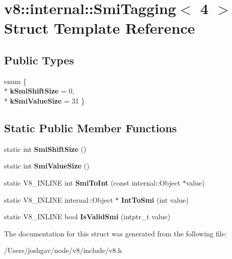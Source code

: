 \hypertarget{structv8_1_1internal_1_1_smi_tagging_3_014_01_4}{}\section{v8\+:\+:internal\+:\+:Smi\+Tagging$<$ 4 $>$ Struct Template Reference}
\label{structv8_1_1internal_1_1_smi_tagging_3_014_01_4}
\subsection*{Public Types}
\begin{DoxyCompactItemize}
\item 
enum \{ \\*
{\bfseries k\+Smi\+Shift\+Size} = 0, 
\\*
{\bfseries k\+Smi\+Value\+Size} = 31
 \}\hypertarget{structv8_1_1internal_1_1_smi_tagging_3_014_01_4_a4a08a18726d053536f2e1988bb1e1cfa}{}\label{structv8_1_1internal_1_1_smi_tagging_3_014_01_4_a4a08a18726d053536f2e1988bb1e1cfa}

\end{DoxyCompactItemize}
\subsection*{Static Public Member Functions}
\begin{DoxyCompactItemize}
\item 
static int {\bfseries Smi\+Shift\+Size} ()\hypertarget{structv8_1_1internal_1_1_smi_tagging_3_014_01_4_a6b4e44bb5de76851c70fb604e1a7a019}{}\label{structv8_1_1internal_1_1_smi_tagging_3_014_01_4_a6b4e44bb5de76851c70fb604e1a7a019}

\item 
static int {\bfseries Smi\+Value\+Size} ()\hypertarget{structv8_1_1internal_1_1_smi_tagging_3_014_01_4_a07e9a8ef19de5cb4bba23cd9756d7b3e}{}\label{structv8_1_1internal_1_1_smi_tagging_3_014_01_4_a07e9a8ef19de5cb4bba23cd9756d7b3e}

\item 
static V8\+\_\+\+I\+N\+L\+I\+NE int {\bfseries Smi\+To\+Int} (const internal\+::\+Object $\ast$value)\hypertarget{structv8_1_1internal_1_1_smi_tagging_3_014_01_4_a62bf3521541e99483c8d0743685dc375}{}\label{structv8_1_1internal_1_1_smi_tagging_3_014_01_4_a62bf3521541e99483c8d0743685dc375}

\item 
static V8\+\_\+\+I\+N\+L\+I\+NE internal\+::\+Object $\ast$ {\bfseries Int\+To\+Smi} (int value)\hypertarget{structv8_1_1internal_1_1_smi_tagging_3_014_01_4_abbc2788d901a590f3b9276e7e0d4059b}{}\label{structv8_1_1internal_1_1_smi_tagging_3_014_01_4_abbc2788d901a590f3b9276e7e0d4059b}

\item 
static V8\+\_\+\+I\+N\+L\+I\+NE bool {\bfseries Is\+Valid\+Smi} (intptr\+\_\+t value)\hypertarget{structv8_1_1internal_1_1_smi_tagging_3_014_01_4_a7ca3b3a7b14e2fbea5decac3675ac619}{}\label{structv8_1_1internal_1_1_smi_tagging_3_014_01_4_a7ca3b3a7b14e2fbea5decac3675ac619}

\end{DoxyCompactItemize}


The documentation for this struct was generated from the following file\+:\begin{DoxyCompactItemize}
\item 
/\+Users/joshgav/node/v8/include/v8.\+h\end{DoxyCompactItemize}
